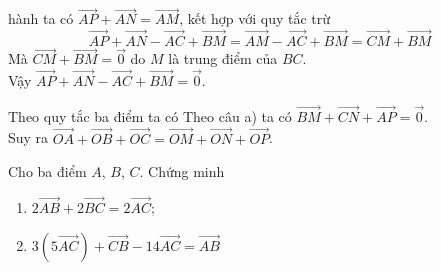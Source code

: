 \begin{bt}
{\begin{listEX}
			hành ta có $\overrightarrow{AP}+\overrightarrow{AN}=\overrightarrow{AM}$, kết hợp với quy tắc trừ
			$$\overrightarrow{AP}+\overrightarrow{AN}-\overrightarrow{AC}+\overrightarrow{BM}=\overrightarrow{AM}-\overrightarrow{AC}+\overrightarrow{BM}=\overrightarrow{CM}+\overrightarrow{BM}$$
			Mà $\overrightarrow{CM}+\overrightarrow{BM}=\overrightarrow{0}$ do $M$ là trung điểm của $B C$.\\
			Vậy $\overrightarrow{AP}+\overrightarrow{AN}-\overrightarrow{AC}+\overrightarrow{BM}=\overrightarrow{0}$.
			\item Theo quy tắc ba điểm ta có
			Theo câu a) ta có $\overrightarrow{BM}+\overrightarrow{CN}+\overrightarrow{AP}=\overrightarrow{0}$.\\
			Suy ra $\overrightarrow{OA}+\overrightarrow{OB}+\overrightarrow{OC}=\overrightarrow{OM}+\overrightarrow{ON}+\overrightarrow{OP}$.
		\end{listEX}
	}
\end{bt}

\begin{bt}%
	Cho ba điểm $A$, $B$, $C$. Chứng minh
	\begin{enumerate}
		\item $2\overrightarrow{AB}+2\overrightarrow{BC}=2\overrightarrow{AC}$;
		\item $3\left(5\overrightarrow{AC}\right)+\overrightarrow{CB}-14\overrightarrow{AC}=\overrightarrow{AB}$
	\end{enumerate}
\end{bt}

